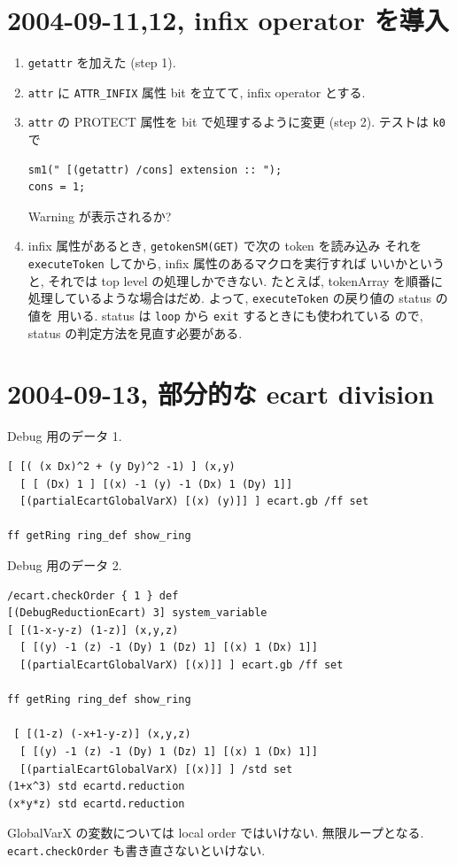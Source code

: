\documentclass{jarticle}
\begin{document}
\section{2004-09-11,12, infix operator を導入}
\begin{enumerate}
\item {\tt getattr} を加えた (step 1). 
\item {\tt attr} に {\tt ATTR\_INFIX} 属性 bit を立てて,
infix operator とする.
\item {\tt attr} の PROTECT 属性を bit で処理するように変更 (step 2).
テストは {\tt k0} で
\begin{verbatim}
sm1(" [(getattr) /cons] extension :: ");
cons = 1;
\end{verbatim}
Warning が表示されるか?
\item infix 属性があるとき, {\tt getokenSM(GET)} で次の token を読み込み
それを {\tt executeToken} してから, infix 属性のあるマクロを実行すれば
いいかというと, それでは top level  の処理しかできない.
たとえば, tokenArray を順番に処理しているような場合はだめ.
よって, {\tt executeToken} の戻り値の status の値を
用いる.  status は {\tt loop} から {\tt exit} するときにも使われている
ので, status の判定方法を見直す必要がある.
\end{enumerate}

\section{2004-09-13, 部分的な ecart division}

\noindent Debug 用のデータ 1.
{\footnotesize \begin{verbatim}
[ [( (x Dx)^2 + (y Dy)^2 -1) ] (x,y) 
  [ [ (Dx) 1 ] [(x) -1 (y) -1 (Dx) 1 (Dy) 1]] 
  [(partialEcartGlobalVarX) [(x) (y)]] ] ecart.gb /ff set

ff getRing ring_def show_ring

\end{verbatim}
}

\noindent Debug 用のデータ 2.
{\footnotesize \begin{verbatim}
/ecart.checkOrder { 1 } def
[(DebugReductionEcart) 3] system_variable
[ [(1-x-y-z) (1-z)] (x,y,z) 
  [ [(y) -1 (z) -1 (Dy) 1 (Dz) 1] [(x) 1 (Dx) 1]] 
  [(partialEcartGlobalVarX) [(x)]] ] ecart.gb /ff set

ff getRing ring_def show_ring

 [ [(1-z) (-x+1-y-z)] (x,y,z) 
  [ [(y) -1 (z) -1 (Dy) 1 (Dz) 1] [(x) 1 (Dx) 1]] 
  [(partialEcartGlobalVarX) [(x)]] ] /std set
(1+x^3) std ecartd.reduction
(x*y*z) std ecartd.reduction
\end{verbatim}
}
GlobalVarX の変数については local order ではいけない.
無限ループとなる.
{\tt ecart.checkOrder} も書き直さないといけない.
\end{document}
